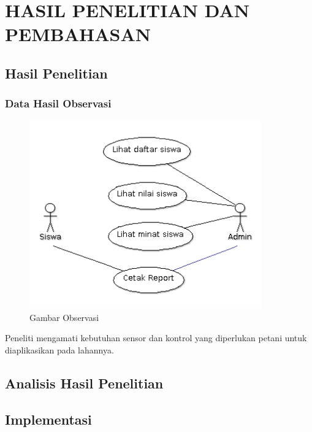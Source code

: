 \chapter{HASIL PENELITIAN DAN PEMBAHASAN}

%
\vspace{4.5pt}
\begin{flushleft}
    \section{Hasil Penelitian}
    \subsection{Data Hasil Observasi}
\vspace{5cm}
\begin{figure}[ht]
	\centering
	\includegraphics[width=10cm]{images/UseCaseDiagramSistemSaatIni}
	\caption{Gambar Observasi}
\end{figure}
Peneliti mengamati kebutuhan sensor dan kontrol yang diperlukan petani untuk diaplikasikan pada lahannya. 
    \section{Analisis Hasil Penelitian}

\end{flushleft}

\vspace{5cm}
\section{Implementasi}

